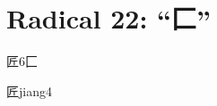 
\section*{Radical 22: ``⼕''}

\begin{entry}{匠}{6}{⼕}
  \begin{phonetics}{匠}{jiang4}
  \end{phonetics}
\end{entry}


